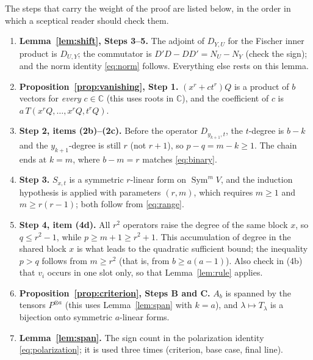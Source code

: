 \documentclass[11pt]{article}
\theoremstyle{definition}
\theoremstyle{remark}
\DeclareMathOperator{\Sym}{Sym}
\newcommand{\C}{\mathbb C}
\newcommand{\D}[2]{D_{#1,#2}}
\begin{document}
The steps that carry the weight of the proof are listed below, in the order
in which a sceptical reader should check them.
\begin{enumerate}[leftmargin=*]
\item \textbf{Lemma~\ref{lem:shift}, Steps 3--5.} The adjoint of $\D YU$ for
the Fischer inner product is $\D UY$; the commutator is
$D'D-DD'=N_U-N_Y$ (check the sign); and the norm identity \eqref{eq:norm}
follows. Everything else rests on this lemma.
\item \textbf{Proposition~\ref{prop:vanishing}, Step 1.} $(x^r+ct^r)Q$ is a
product of $b$ vectors for \emph{every} $c\in\C$ (this uses roots in $\C$),
and the coefficient of $c$ is $a\,T(x^rQ,\ldots,x^rQ,t^rQ)$.
\item \textbf{Step 2, items (2b)--(2c).} Before the operator
$\D{y_{k+1}}{t}$, the $t$-degree is $b-k$ and the $y_{k+1}$-degree is still
$r$ (not $r+1$), so $p-q=m-k\ge1$. The chain ends at $k=m$, where
$b-m=r$ matches \eqref{eq:binary}.
\item \textbf{Step 3.} $S_{x,t}$ is a symmetric $r$-linear form on
$\Sym^mV$, and the induction hypothesis is applied with parameters $(r,m)$,
which requires $m\ge1$ and $m\ge r(r-1)$; both follow from
\eqref{eq:range}.
\item \textbf{Step 4, item (4d).} All $r^2$ operators raise the degree of
the same block $x$, so $q\le r^2-1$, while $p\ge m+1\ge r^2+1$. This
accumulation of degree in the shared block $x$ is what leads to the
quadratic sufficient bound; the inequality $p>q$ follows from $m\ge r^2$
(that is, from $b\ge a(a-1)$). Also check
in (4b) that $v_i$ occurs in one slot only, so that Lemma~\ref{lem:rule}
applies.
\item \textbf{Proposition~\ref{prop:criterion}, Steps B and C.} $A_b$ is
spanned by the tensors $P^{\otimes a}$ (this uses Lemma~\ref{lem:span} with
$k=a$), and $\lambda\mapsto T_\lambda$ is a bijection onto symmetric
$a$-linear forms.
\item \textbf{Lemma~\ref{lem:span}.} The sign count in the polarization
identity \eqref{eq:polarization}; it is used three times (criterion, base
case, final line).
\end{enumerate}
\end{document}
